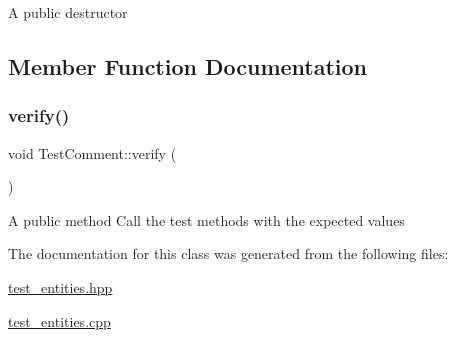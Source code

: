 A public destructor 

\subsection{Member Function Documentation}
\mbox{\label{class_test_comment_a35b7553c77a3922bf0739b8d39073948}} 
\subsubsection{\texorpdfstring{verify()}{verify()}}
{\footnotesize\ttfamily void Test\+Comment\+::verify (\begin{DoxyParamCaption}{ }\end{DoxyParamCaption})}

A public method Call the test methods with the expected values 

The documentation for this class was generated from the following files\+:\begin{DoxyCompactItemize}
\item 
\hyperlink{test__entities_8hpp}{test\+\_\+entities.\+hpp}\item 
\hyperlink{test__entities_8cpp}{test\+\_\+entities.\+cpp}\end{DoxyCompactItemize}

